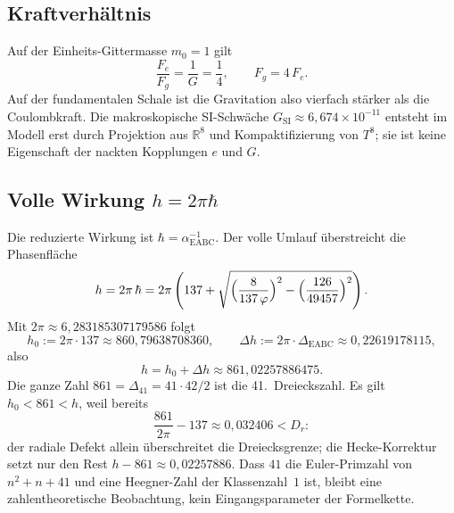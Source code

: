 \documentclass[11pt,a4paper]{article}
\begin{document}
\subsection{Kraftverhältnis}
Auf der Einheits-Gittermasse $m_0=1$ gilt
\begin{equation}
\frac{F_e}{F_g}=\frac{1}{G}=\frac14,\qquad F_g=4\,F_e.
\end{equation}
Auf der fundamentalen Schale ist die Gravitation also vierfach stärker als die Coulombkraft.
Die makroskopische SI-Schwäche $G_{\mathrm{SI}}\approx 6{,}674\times 10^{-11}$ entsteht im Modell erst durch Projektion aus $\mathbb{R}^8$ und Kompaktifizierung von $T^8$;
sie ist keine Eigenschaft der nackten Kopplungen $e$ und $G$.

\subsection{Volle Wirkung $h=2\pi\hbar$}
Die reduzierte Wirkung ist $\hbar=\alpha^{-1}_{\mathrm{EABC}}$.
Der volle Umlauf überstreicht die Phasenfläche
\begin{equation}
\label{eq:h}
h=2\pi\,\hbar
=2\pi\left(137+\sqrt{\Bigl(\frac{8}{137\,\varphi}\Bigr)^2-\Bigl(\frac{126}{49457}\Bigr)^2}\right).
\end{equation}
Mit $2\pi\approx 6{,}283185307179586$ folgt
\begin{equation}
h_0:=2\pi\cdot 137\approx 860{,}79638708360,\qquad
\Delta h:=2\pi\cdot\Delta_{\mathrm{EABC}}\approx 0{,}22619178115,
\end{equation}
also
\begin{equation}
h=h_0+\Delta h\approx 861{,}02257886475.
\end{equation}
Die ganze Zahl $861=\Delta_{41}=41\cdot 42/2$ ist die 41.\ Dreieckszahl.
Es gilt $h_0<861<h$, weil bereits
\begin{equation}
\frac{861}{2\pi}-137\approx 0{,}032406<D_r:
\end{equation}
der radiale Defekt allein überschreitet die Dreiecksgrenze; die Hecke-Korrektur setzt nur den Rest
$h-861\approx 0{,}02257886$.
Dass $41$ die Euler-Primzahl von $n^2+n+41$ und eine Heegner-Zahl der Klassenzahl~$1$ ist, bleibt eine zahlentheoretische Beobachtung, kein Eingangsparameter der Formelkette.
\end{document}
